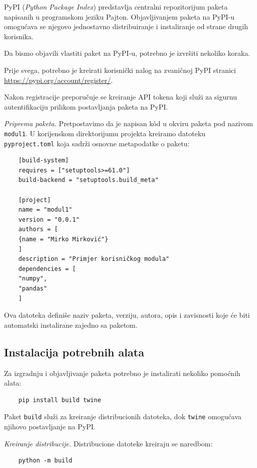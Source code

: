 PyPI (\textit{Python Package Index}) predstavlja centralni repozitorijum paketa napisanih u programskom jeziku Pajton. Objavljivanjem paketa na PyPI-u omogućava se njegovo jednostavno distribuiranje i instaliranje od strane drugih korisnika.

Da bismo objavili vlastiti paket na PyPI-u, potrebno je izvršiti nekoliko koraka.

Prije svega, potrebno je kreirati korisnički nalog na zvaničnoj PyPI stranici \url{https://pypi.org/account/register/}. 


Nakon registracije preporučuje se kreiranje API tokena koji služi za sigurnu autentifikaciju prilikom postavljanja paketa na PyPI.

\textit{Priprema paketa.} Pretpostavimo da je napisan k\^od u okviru paketa pod nazivom \texttt{modul1}. U korijenskom direktorijumu projekta kreiramo datoteku \texttt{pyproject.toml} koja sadrži osnovne metapodatke o paketu:

\begin{verbatim}
	[build-system]
	requires = ["setuptools>=61.0"]
	build-backend = "setuptools.build_meta"
	
	[project]
	name = "modul1"
	version = "0.0.1"
	authors = [
	{name = "Mirko Mirković"}
	]
	description = "Primjer korisničkog modula"
	dependencies = [
	"numpy",
	"pandas"
	]
\end{verbatim}

Ova datoteka definiše naziv paketa, verziju, autora, opis i zavisnosti koje će biti automatski instalirane zajedno sa paketom.

\subsection*{Instalacija potrebnih alata}

Za izgradnju i objavljivanje paketa potrebno je instalirati nekoliko pomoćnih alata:

\begin{verbatim}
	pip install build twine
\end{verbatim}

Paket \texttt{build} služi za kreiranje distribucionih datoteka, dok \texttt{twine} omogućava njihovo postavljanje na PyPI.

\textit{Kreiranje distribucije.} Distribucione datoteke kreiraju se naredbom:

\begin{verbatim}
	python -m build
\end{verbatim}

